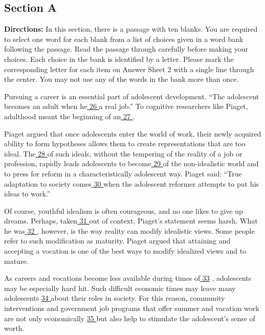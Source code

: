\documentclass[UTF8,11pt]{ctexart}
\begin{document}
\subsection*{\textbf{Section A}}


\textbf{Directions:} In this section, there is a passage with ten blanks. You are required to select one word for each blank from a list of choices given in a word bank following the passage. Read the passage through carefully before making your choices. Each choice in the bank is identified by a letter. Please mark the corresponding letter for each item on Answer Sheet 2 with a single line through the center. You may not use any of the words in the bank more than once.


Pursuing a career is an essential part of adolescent development. “The adolescent becomes an adult when he\uline{ 26 }a real job.” To cognitive researchers like Piaget, adulthood meant the beginning of an\uline{ 27 }.


Piaget argued that once adolescents enter the world of work, their newly acquired ability to form hypotheses allows them to create representations that are too ideal. The\uline{ 28 }of such ideals, without the tempering of the reality of a job or profession, rapidly leads adolescents to become\uline{ 29 }of the non-idealistic world and to press for reform in a characteristically adolescent way. Piaget said: “True adaptation to society comes\uline{ 30 }when the adolescent reformer attempts to put his ideas to work.”


Of course, youthful idealism is often courageous, and no one likes to give up dreams. Perhaps, taken\uline{ 31 }out of context, Piaget’s statement seems harsh. What he was\uline{ 32 }, however, is the way reality can modify idealistic views. Some people refer to such modification as maturity. Piaget argued that attaining and accepting a vocation is one of the best ways to modify idealized views and to mature.


As careers and vocations become less available during times of\uline{ 33} , adolescents may be especially hard hit. Such difficult economic times may leave many adolescents \uline{34 }about their roles in society. For this reason, community interventions and government job programs that offer summer and vacation work are not only economically \uline{35 }but also help to stimulate the adolescent’s sense of worth.
\end{document}
